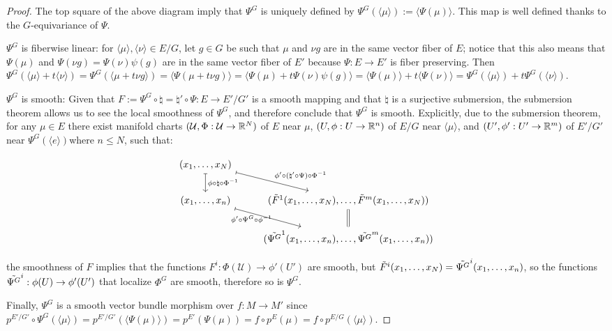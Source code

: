 \begin{proof}
The top square of the above diagram imply that $\Psi^{G}$ is uniquely defined by $\Psi^{G}(\langle \mu \rangle) := \langle \Psi(\mu) \rangle$. This map is well defined thanks to the $G$-equivariance of $\Psi$.

$\Psi^G$ is fiberwise linear: for $\langle \mu \rangle, \langle \nu \rangle \in E/G$, let $g \in G$ be such that $\mu$ and $\nu g$ are in the same vector fiber of $E$; notice that this also means that $\Psi(\mu)$ and $\Psi(\nu g) = \Psi(\nu) \psi(g)$ are in the same vector fiber of $E'$ because $\Psi:E \to E'$ is fiber preserving. 
Then $\Psi^{G}(\langle \mu \rangle + t\langle \nu \rangle) = \Psi^{G}(\langle \mu  + t \nu g \rangle)  = \langle \Psi(\mu + t \nu g ) \rangle = \langle \Psi(\mu) + t \Psi(\nu)\psi(g) \rangle = \langle \Psi(\mu) \rangle + t \langle \Psi(\nu) \rangle = \Psi^{G}(\langle \mu \rangle) + t\Psi^{G}(\langle \nu \rangle)$.

$\Psi^{G}$ is smooth: Given that $F := \Psi^{G} \circ \natural = \natural' \circ \Psi : E \to E'/G'$ is a smooth mapping and that $\natural$ is a surjective submersion, the submersion theorem allows us to see the local smoothness of $\Psi^{G}$, and therefore conclude that $\Psi^{G}$ is smooth. Explicitly, due to the submersion theorem, for any $\mu \in E$ there exist manifold charts $(\mathcal U, \Phi: \mathcal U \to \mathbb{R}^N)$ of $E$ near $\mu$, $(U, \phi: U \to \RR^n)$ of $E/G$ near $\langle \mu \rangle$, and $(U', \phi': U' \to \RR^m)$ of $E'/G'$ near $\Psi^{G}(\langle e \rangle)$where $n \leq N$, such that: %

\[
\begin{tikzcd}
    (x_1, \dots, x_N) \arrow[mapsto]{rd}{\phi' \circ (\natural' \circ \Psi) \circ \Phi^{-1} } \arrow[mapsto]{d}{\phi \circ \natural \circ \Phi^{-1}} & \\
    (x_1, \dots, x_n) \arrow[mapsto]{rd}[below, near start]{\phi' \circ \Psi^{G} \circ \phi^{-1}} & (\Tilde F^1(x_1, \dots, x_N), \dots, \Tilde F^m(x_1, \dots, x_N)) \arrow[equal]{d}\\
    & (\Tilde{\Psi^{G}}^1(x_1, \dots, x_n), \dots, \Tilde{\Psi^{G}}^m(x_1, \dots, x_n))
\end{tikzcd}
\]

the smoothness of $F$ implies that the functions $F^i:\Phi(\mathcal U) \to \phi'(U')$ are smooth, but $\Tilde F^i(x_1, \dots, x_N) = \Tilde{\Psi^{G}}^i(x_1, \dots, x_n)$, so the functions $\Tilde{\Psi^{G}}^i:\phi(U) \to \phi'(U')$ that localize $\Phi^{G}$ are smooth, therefore so is $\Psi^{G}$. 

Finally, $\Psi^{G}$ is a smooth vector bundle morphism over $f:M \to M'$ since $p^{E'/G'} \circ \Psi^{G}(\langle \mu \rangle) = p^{E'/G'}(\langle \Psi(\mu) \rangle) = p^{E'}(\Psi(\mu)) = f \circ p^E (\mu) = f \circ p^{E/G} (\langle \mu \rangle)$.

\end{proof}

